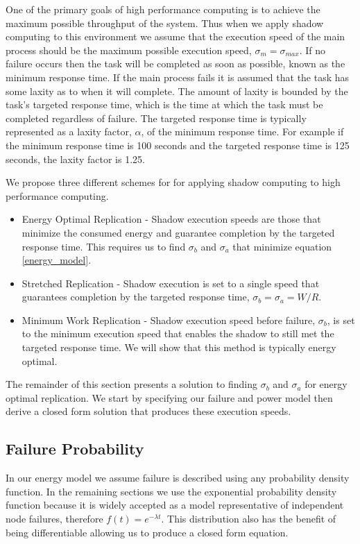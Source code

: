 One of the primary goals of high performance computing is to achieve
the maximum possible throughput of the system. Thus when we
apply shadow computing to this environment we assume that the
execution speed of the main process should be the maximum possible
execution speed, $\sigma_m=\sigma_{max}$. If no failure occurs then
the task will be completed as soon as possible, known as the minimum
response time. If the main process fails it is assumed that the task
has some laxity as to when it will complete. The amount of laxity is
bounded by the task's targeted response time, which is the time at
which the task must be completed regardless of failure. The targeted
response time is typically represented as a laxity factor, $\alpha$,
of the minimum response time. For example if the minimum response time
is 100 seconds and the targeted response time is 125 seconds, the
laxity factor is 1.25.

We propose three different schemes for for applying shadow computing to
high performance computing.
\begin{itemize}
\item 
Energy Optimal Replication - Shadow execution speeds are those that
minimize the consumed energy and guarantee completion by the targeted
response time. This requires us to find $\sigma_b$ and $\sigma_a$ that
minimize equation \ref{energy_model}.
\item 
Stretched Replication - Shadow execution is set to a single speed that
guarantees completion by the targeted response time, $\sigma_b =
\sigma_a = W/R$.
\item 
Minimum Work Replication - Shadow execution speed before failure,
$\sigma_b$, is set to the minimum execution speed that enables the
shadow to still met the targeted response time. We will show that this
method is typically energy optimal.
\end{itemize}
The remainder of this section presents a solution to finding
$\sigma_b$ and $\sigma_a$ for energy optimal replication. We start by
specifying our failure and power model then derive a closed form
solution that produces these execution speeds.

\subsection{Failure Probability}

In our energy model we assume failure is described using any
probability density function. In the remaining sections we use the
exponential probability density function because it is widely accepted
as a model representative of independent node failures, therefore
$f(t)=e^{-\lambda t}$. This distribution also has the benefit of being
differentiable allowing us to produce a closed form equation.


